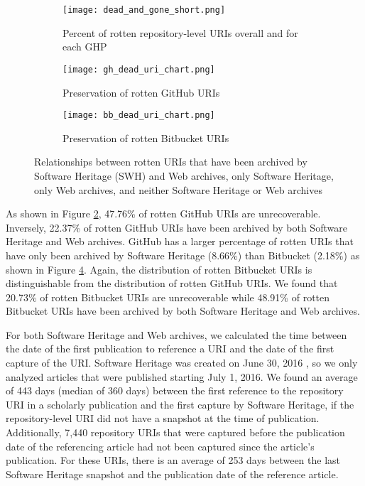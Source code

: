 \begin{figure}
\centering
\begin{subfigure}{0.8\textwidth}
    \centering
    \texttt{[image: dead\_and\_gone\_short.png]}
    \caption{Percent of rotten repository-level URIs overall and for each GHP}
    \label{fig:dead_and_gone}
\end{subfigure}
\centering
\begin{subfigure}{0.8\textwidth}
    \centering
    \texttt{[image: gh\_dead\_uri\_chart.png]}
    \caption{Preservation of rotten GitHub URIs}
    \label{fig:gh_dead_sankey}
\end{subfigure}
\begin{subfigure}{0.8\textwidth}
    \centering
    \texttt{[image: bb\_dead\_uri\_chart.png]}
    \caption{Preservation of rotten Bitbucket URIs}
    \label{fig:bb_dead_sankey}
\end{subfigure}
\caption{Relationships between rotten URIs that have been archived by Software Heritage (SWH) and Web archives, only Software Heritage, only Web archives, and neither Software Heritage or Web archives}
\end{figure}

As shown in Figure \ref{fig:gh_dead_sankey}, 47.76\% of rotten GitHub URIs are unrecoverable. Inversely, 22.37\% of rotten GitHub URIs have been archived by both Software Heritage and Web archives. GitHub has a larger percentage of rotten URIs that have only been archived by Software Heritage (8.66\%) than Bitbucket (2.18\%) as shown in Figure \ref{fig:bb_dead_sankey}. Again, the distribution of rotten Bitbucket URIs is distinguishable from the distribution of rotten GitHub URIs. We found that 20.73\% of rotten Bitbucket URIs are unrecoverable while 48.91\% of rotten Bitbucket URIs have been archived by both Software Heritage and Web archives.  

For both Software Heritage and Web archives, we calculated the time between the date of the first publication to reference a URI and the date of the first capture of the URI. Software Heritage was created on June 30, 2016 \cite{dicosmo_swhblog}, so we only analyzed articles that were published starting July 1, 2016. We found an average of 443 days (median of 360 days) between the first reference to the repository URI in a scholarly publication and the first capture by Software Heritage, if the repository-level URI did not have a snapshot at the time of publication. Additionally, 7,440 repository URIs that were captured before the publication date of the referencing article had not been captured since the article's publication. For these  URIs, there is an average of 253 days between the last Software Heritage snapshot and the publication date of the reference article. 

